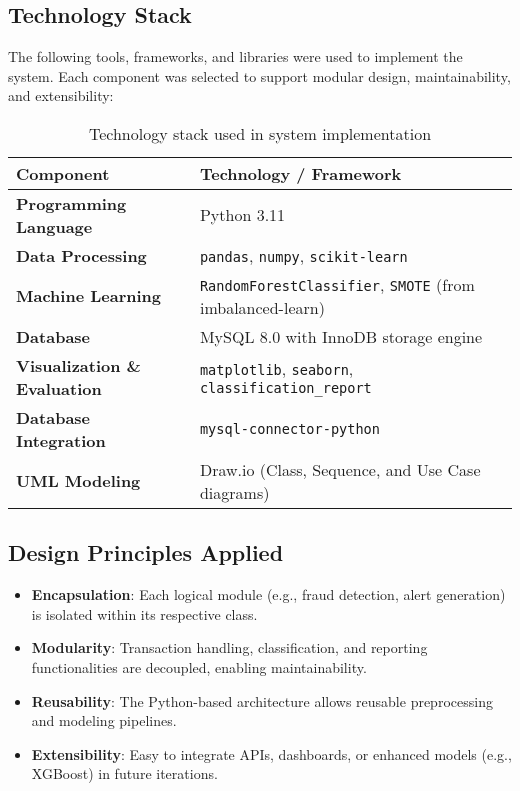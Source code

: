\documentclass[12pt]{article}
\begin{document}
\subsection{Technology Stack}
The following tools, frameworks, and libraries were used to implement the system. Each component was selected to support modular design, maintainability, and extensibility:

\begin{table}[h!]
\centering
\begin{tabular}{@{}ll@{}}
\toprule
\textbf{Component} & \textbf{Technology / Framework} \\ \midrule
\textbf{Programming Language} & Python 3.11 \\
\textbf{Data Processing} & \texttt{pandas}, \texttt{numpy}, \texttt{scikit-learn} \\
\textbf{Machine Learning} & \texttt{RandomForestClassifier}, \texttt{SMOTE} (from imbalanced-learn) \\
\textbf{Database} & MySQL 8.0 with InnoDB storage engine \\
\textbf{Visualization \& Evaluation} & \texttt{matplotlib}, \texttt{seaborn}, \texttt{classification\_report} \\
\textbf{Database Integration} & \texttt{mysql-connector-python} \\
\textbf{UML Modeling} & Draw.io (Class, Sequence, and Use Case diagrams) \\
\bottomrule
\end{tabular}
\caption{Technology stack used in system implementation}
\end{table}

\subsection{Design Principles Applied}
\begin{itemize}
    \item \textbf{Encapsulation}: Each logical module (e.g., fraud detection, alert generation) is isolated within its respective class.
    \item \textbf{Modularity}: Transaction handling, classification, and reporting functionalities are decoupled, enabling maintainability.
    \item \textbf{Reusability}: The Python-based architecture allows reusable preprocessing and modeling pipelines.
    \item \textbf{Extensibility}: Easy to integrate APIs, dashboards, or enhanced models (e.g., XGBoost) in future iterations.
\end{itemize}
\end{document}
